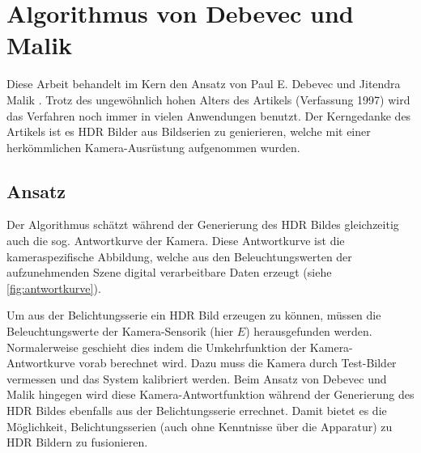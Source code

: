 \chapter{Algorithmus von Debevec und Malik \cite{paper}}
\label{chap:algo}
Diese Arbeit behandelt im Kern den Ansatz von Paul E. Debevec und Jitendra Malik \cite{paper}. Trotz des ungewöhnlich hohen Alters des Artikels (Verfassung 1997) wird das Verfahren noch immer in vielen Anwendungen benutzt. Der Kerngedanke des Artikels ist es \gls{HDR} Bilder aus Bildserien zu genierieren, welche mit einer herkömmlichen Kamera-Ausrüstung aufgenommen wurden.

\section{Ansatz}
Der Algorithmus schätzt während der Generierung des \gls{HDR} Bildes gleichzeitig auch die sog. Antwortkurve der Kamera. Diese Antwortkurve ist die kameraspezifische Abbildung, welche aus den Beleuchtungswerten der aufzunehmenden Szene digital verarbeitbare Daten erzeugt (siehe \autoref{fig:antwortkurve}). 

Um aus der Belichtungsserie ein \gls{HDR} Bild erzeugen zu können, müssen die Beleuchtungswerte der Kamera-Sensorik (hier $E$) herausgefunden werden. Normalerweise geschieht dies indem die Umkehrfunktion der Kamera-Antwortkurve vorab berechnet wird. Dazu muss die Kamera durch Test-Bilder vermessen und das System kalibriert werden. Beim Ansatz von Debevec und Malik hingegen wird diese Kamera-Antwortfunktion während der Generierung des \gls{HDR} Bildes ebenfalls aus der Belichtungsserie errechnet. Damit bietet es die Möglichkeit, Belichtungsserien (auch ohne Kenntnisse über die Apparatur) zu \gls{HDR} Bildern zu fusionieren.


